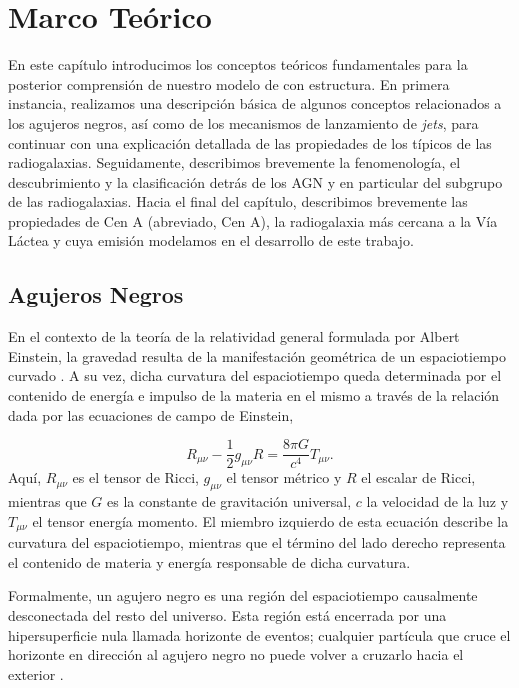 \chapter{Marco Te\'orico}\label{cha:Marco}

	En este capítulo introducimos los conceptos teóricos fundamentales para la posterior comprensión de nuestro modelo de \jet con estructura.
	En primera instancia, realizamos una descripción básica de algunos conceptos relacionados a los agujeros negros, así como de los mecanismos de lanzamiento de \textit{jets}, para continuar con una explicación detallada de las propiedades de los \jets típicos de las radiogalaxias.
	Seguidamente, describimos brevemente la fenomenología, el descubrimiento y la clasificaci\'on detrás de los AGN y en particular del subgrupo de las radiogalaxias.
	Hacia el final del capítulo, describimos brevemente las propiedades de Cen A (abreviado, Cen A), la radiogalaxia más cercana a la Vía Láctea y cuya emisión modelamos en el desarrollo de este trabajo.
%


\section{Agujeros Negros}

	En el contexto de la teoría de la relatividad general formulada por Albert Einstein, la gravedad resulta de la manifestación geométrica de un espaciotiempo curvado \citep{Einstein1916}.
	A su vez, dicha curvatura del espaciotiempo queda determinada por el contenido de energía e impulso de la materia en el mismo a través de la relación dada por las ecuaciones de campo de Einstein,
	
	\begin{equation}
	R_{\mu \nu}-\frac{1}{2}g_{\mu \nu}R=\frac{8\pi G}{c^4}T_{\mu \nu}.
	\end{equation}
	Aquí, $R_{\mu \nu}$ es el tensor de Ricci, $g_{\mu \nu}$ el tensor métrico y $R$ el escalar de Ricci, mientras que $G$ es la constante de gravitaci\'on universal, $c$ la velocidad de la luz y $T_{\mu \nu}$ el tensor energía momento. El miembro izquierdo de esta ecuación describe la curvatura del espaciotiempo, mientras que el término del lado derecho representa el contenido de materia y energía responsable de dicha curvatura.
	
	Formalmente, un agujero negro es una región del espaciotiempo causalmente desconectada del resto del universo.
	Esta región está encerrada por una hipersuperficie nula llamada horizonte de eventos; cualquier partícula que cruce el horizonte en dirección al agujero negro no puede volver a cruzarlo hacia el exterior \citep{Carroll2004}.
	
